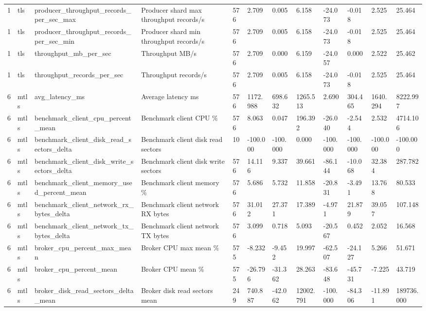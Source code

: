 \begin{longtable}{llllllllllll}
1 & tls & producer\_throughput\_records\_per\_sec\_max & Producer shard max throughput records/s & 576 & 2.709 & 0.005 & 6.158 & -24.073 & -0.018 & 2.525 & 25.464 \\
1 & tls & producer\_throughput\_records\_per\_sec\_min & Producer shard min throughput records/s & 576 & 2.709 & 0.005 & 6.158 & -24.073 & -0.018 & 2.525 & 25.464 \\
1 & tls & throughput\_mb\_per\_sec & Throughput MB/s & 576 & 2.709 & 0.000 & 6.159 & -24.057 & 0.000 & 2.522 & 25.462 \\
1 & tls & throughput\_records\_per\_sec & Throughput records/s & 576 & 2.709 & 0.005 & 6.158 & -24.073 & -0.018 & 2.525 & 25.464 \\
6 & mtls & avg\_latency\_ms & Average latency ms & 576 & 1172.988 & 698.632 & 1265.513 & 2.690 & 304.465 & 1640.294 & 8222.997 \\
6 & mtls & benchmark\_client\_cpu\_percent\_mean & Benchmark client CPU \% & 576 & 8.063 & 0.047 & 196.392 & -26.040 & -2.544 & 2.532 & 4714.106 \\
6 & mtls & benchmark\_client\_disk\_read\_sectors\_delta & Benchmark client disk read sectors & 10 & -100.000 & -100.000 & 0.000 & -100.000 & -100.000 & -100.000 & -100.000 \\
6 & mtls & benchmark\_client\_disk\_write\_sectors\_delta & Benchmark client disk write sectors & 576 & 14.116 & 9.337 & 39.661 & -86.144 & -10.068 & 32.384 & 287.782 \\
6 & mtls & benchmark\_client\_memory\_used\_percent\_mean & Benchmark client memory \% & 576 & 5.686 & 5.732 & 11.858 & -20.831 & -3.491 & 13.768 & 80.533 \\
6 & mtls & benchmark\_client\_network\_rx\_bytes\_delta & Benchmark client network RX bytes & 576 & 31.012 & 27.371 & 17.389 & -4.971 & 21.879 & 39.057 & 107.148 \\
6 & mtls & benchmark\_client\_network\_tx\_bytes\_delta & Benchmark client network TX bytes & 576 & 3.099 & 0.718 & 5.093 & -20.567 & 0.452 & 2.052 & 16.568 \\
6 & mtls & broker\_cpu\_percent\_max\_mean & Broker CPU max mean \% & 575 & -8.232 & -9.452 & 19.997 & -62.507 & -24.127 & 5.266 & 51.671 \\
6 & mtls & broker\_cpu\_percent\_mean & Broker CPU mean \% & 575 & -26.796 & -31.362 & 28.263 & -83.648 & -45.731 & -7.225 & 43.719 \\
6 & mtls & broker\_disk\_read\_sectors\_delta\_mean & Broker disk read sectors mean & 249 & 740.887 & -42.062 & 12002.791 & -100.000 & -84.306 & -11.891 & 189736.000 \\

\end{longtable}
